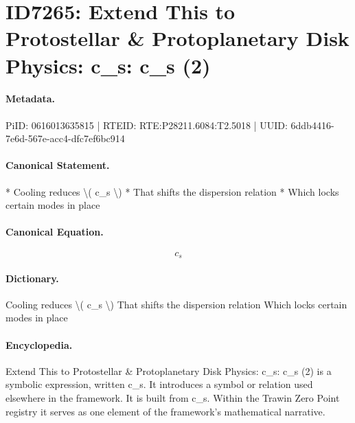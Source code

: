 \section*{ID7265: Extend This to Protostellar \& Protoplanetary Disk Physics: c\_s: c\_s (2)}
\paragraph{Metadata.}
PiID: 0616013635815 | RTEID: RTE:P28211.6084:T2.5018 | UUID: 6ddb4416-7e6d-567e-acc4-dfc7ef6bc914

\paragraph{Canonical Statement.}
* Cooling reduces \textbackslash{}( c\_s \textbackslash{}) * That shifts the dispersion relation * Which locks certain modes in place

\paragraph{Canonical Equation.}
\[
c_s
\]

\paragraph{Dictionary.}
Cooling reduces \textbackslash{}( c\_s \textbackslash{}) That shifts the dispersion relation Which locks certain modes in place

\paragraph{Encyclopedia.}
Extend This to Protostellar \& Protoplanetary Disk Physics: c\_s: c\_s (2) is a symbolic expression, written c\_s. It introduces a symbol or relation used elsewhere in the framework. It is built from c\_s. Within the Trawin Zero Point registry it serves as one element of the framework's mathematical narrative.

